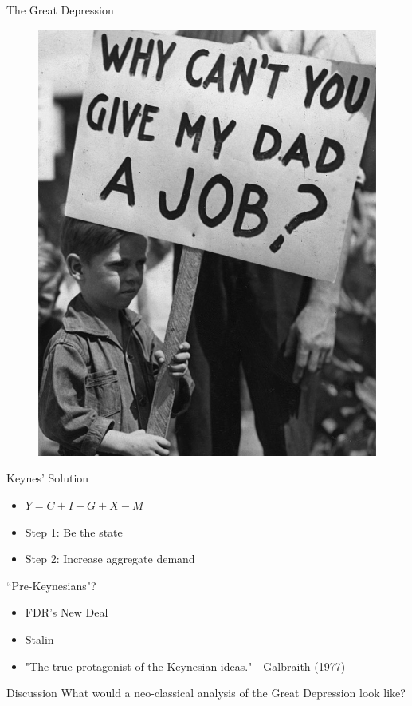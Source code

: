 \documentclass{beamer}
\begin{document}
\begin{frame}{The Great Depression}
        
       \begin{figure}[htpb]
       	\centering
       	\includegraphics[width=0.6\linewidth]{../img/depression.jpeg}
       \end{figure} 
        
\end{frame}

\begin{frame}{Keynes' Solution}
\begin{itemize}
    \item $Y=C+I+G+X-M$ %
    \item Step 1: Be the state
    \item Step 2: Increase aggregate demand %
    
    
\end{itemize}
\end{frame}

\begin{frame}{``Pre-Keynesians"?}
\begin{itemize}
    \item FDR's New Deal
    \item Stalin
    \item "The true protagonist of the Keynesian ideas." - Galbraith (1977)
\end{itemize}
\end{frame}

\begin{frame}{Discussion}
     What would a neo-classical analysis of the Great Depression look like? %
\end{frame}{}
\end{document}
